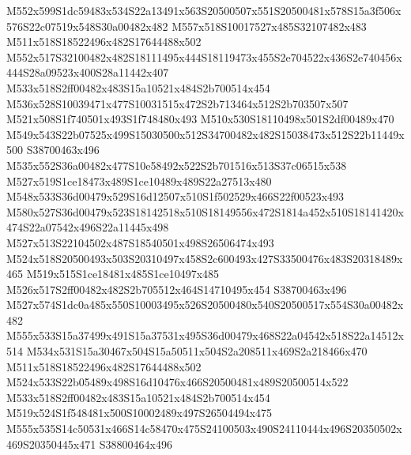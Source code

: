\documentclass{article}
\begin{document}
\begin{multicols}{2}
M552x599S1dc59483x534S22a13491x563S20500507x551S20500481x578S15a3f506x576S22c07519x548S30a00482x482 M557x518S10017527x485S32107482x483 M511x518S18522496x482S17644488x502 M552x517S32100482x482S18111495x444S18119473x455S2e704522x436S2e740456x444S28a09523x400S28a11442x407 M533x518S2ff00482x483S15a10521x484S2b700514x454 M536x528S10039471x477S10031515x472S2b713464x512S2b703507x507 M521x508S1f740501x493S1f748480x493 M510x530S18110498x501S2df00489x470 M549x543S22b07525x499S15030500x512S34700482x482S15038473x512S22b11449x500 S38700463x496 M535x552S36a00482x477S10e58492x522S2b701516x513S37c06515x538 M527x519S1ce18473x489S1ce10489x489S22a27513x480 M548x533S36d00479x529S16d12507x510S1f502529x466S22f00523x493 M580x527S36d00479x523S18142518x510S18149556x472S1814a452x510S18141420x474S22a07542x496S22a11445x498 M527x513S22104502x487S18540501x498S26506474x493 M524x518S20500493x503S20310497x458S2c600493x427S33500476x483S20318489x465 M519x515S1ce18481x485S1ce10497x485 M526x517S2ff00482x482S2b705512x464S14710495x454 S38700463x496 M527x574S1dc0a485x550S10003495x526S20500480x540S20500517x554S30a00482x482 M555x533S15a37499x491S15a37531x495S36d00479x468S22a04542x518S22a14512x514 M534x531S15a30467x504S15a50511x504S2a208511x469S2a218466x470 M511x518S18522496x482S17644488x502 M524x533S22b05489x498S16d10476x466S20500481x489S20500514x522 M533x518S2ff00482x483S15a10521x484S2b700514x454 M519x524S1f548481x500S10002489x497S26504494x475 M555x535S14c50531x466S14c58470x475S24100503x490S24110444x496S20350502x469S20350445x471 S38800464x496


\end{multicols}
\end{document}
